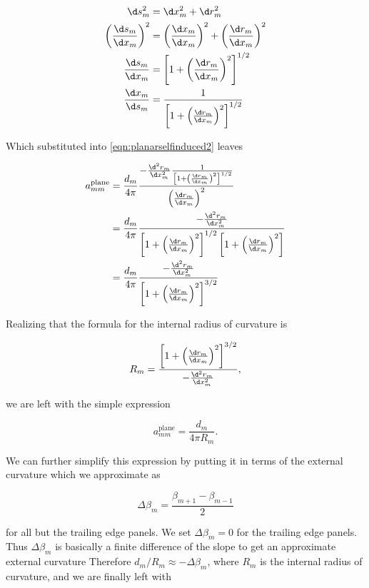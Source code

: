 \begin{align}
	\d s_m^2 &= \d x_m^2 + \d r_m^2 \\
	\left(\frac{\d s_m}{\d x_m}\right)^2 &= \left(\frac{\d x_m}{\d x_m}\right)^2 + \left(\frac{\d r_m}{\d x_m}\right)^2 \\
	\frac{\d s_m}{\d x_m} &= \left[1 + \left(\frac{\d r_m}{\d x_m}\right)^2\right]^{1/2} \\
	\frac{\d x_m}{\d s_m} &= \frac{1}{\left[1 + \left(\frac{\d r_m}{\d x_m}\right)^2\right]^{1/2} }
\end{align}

\noindent Which substituted into \cref{eqn:planarselfinduced2} leaves

\begin{align}
	a^\text{plane}_{mm} &= \frac{d_m}{4 \pi}
	\frac{
		- \frac{\d^2 r_m}{\d x_m^2} \frac{1}{\left[1 + \left(\frac{\d r_m}{\d x_m}\right)^2\right]^{1/2} }
	}{
		\left(\frac{\d r_m}{\d x_m}\right)^2
	} \\
	&= \frac{d_m}{4 \pi}
	\frac{
		- \frac{\d^2 r_m}{\d x_m^2}
	}{
		\left[1 + \left(\frac{\d r_m}{\d x_m}\right)^2\right]^{1/2} \left[1 + \left(\frac{\d r_m}{\d x_m}\right)^2\right]
	} \\
	&= \frac{d_m}{4 \pi}
	\frac{
		- \frac{\d^2 r_m}{\d x_m^2}
	}{
		\left[1 + \left(\frac{\d r_m}{\d x_m}\right)^2\right]^{3/2}
	}
\end{align}

Realizing that the formula for the internal radius of curvature is

\begin{equation}
	R_m = \frac{
		\left[1 + \left(\frac{\d r_m}{\d x_m}\right)^2\right]^{3/2}
	}{
		-\frac{\d^2 r_m}{\d x_m^2}
	},
\end{equation}

\noindent we are left with the simple expression

\begin{equation}
	a^\text{plane}_{mm} = \frac{d_m}{4 \pi R_m}.
\end{equation}

We can further simplify this expression by putting it in terms of the external curvature which we approximate as

\begin{equation}
	\Delta \beta_m = \frac{\beta_{m+1} - \beta_{m-1}}{2}
\end{equation}

\noindent for all but the trailing edge panels.
We set \(\Delta \beta_m = 0\) for the trailing edge panels.
Thus \(\Delta \beta_m\) is basically a finite difference of the slope to get an approximate external curvature
Therefore \(d_m/R_m \approx -\Delta \beta_m\), where \(R_m\) is the internal radius of curvature, and we are finally left with

